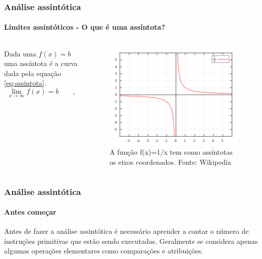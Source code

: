 \begin{frame}
	\frametitle{Análise assintótica}
	\framesubtitle{Limites assintóticos - O que é uma assíntota?}
	\begin{columns}
		\begin{column}{0.5\textwidth}
			\par Dada uma $f(x)=b$ uma assíntota é a curva dada pela equação \ref{eq:assintota}.
			\begin{equation}
				\lim_{x\to\infty} f(x) = b \qquad,
				\label{eq:assintota}
			\end{equation}
		\end{column}
		\begin{column}{0.5\textwidth}
			\begin{figure}
				\centering
				\includegraphics[width=.9\linewidth]{images/assintotas}
				\caption{A função f(x)=1/x tem como assíntotas os eixos coordenados. Fonte: Wikipedia}
				\label{fig:assintotas}
			\end{figure}
		\end{column}
	\end{columns}
\end{frame}

\begin{frame}[fragile]
	\frametitle{Análise assintótica}
	\framesubtitle{Antes começar}
	
	\par Antes de fazer a análise assintótica é necessário aprender a contar o número de instruções primitivas que estão sendo executadas. Geralmente se considera apenas algumas operações elementares como comparações e atribuições.	
\end{frame}

